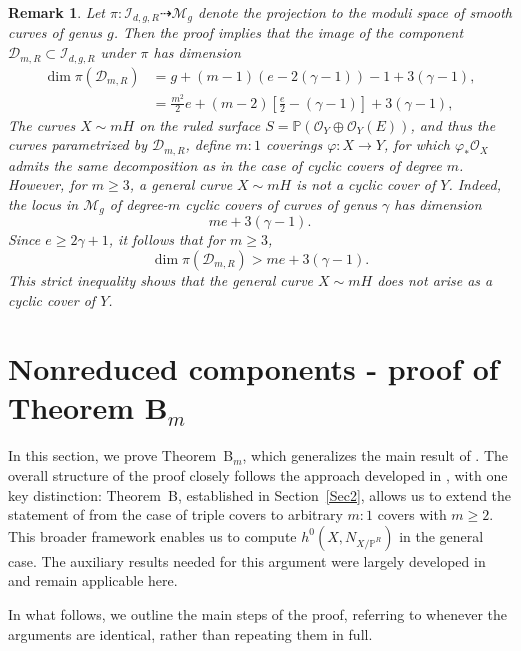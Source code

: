 \documentclass[a4paper,12pt]{amsart}
\newtheorem{remark}[thm]{Remark}
\def\dim{\operatorname{dim}}
\begin{document}
\medskip

\begin{remark}
Let $\pi : \mathcal{I}_{d, g, R} \dashrightarrow \mathcal{M}_g$ denote the projection to the moduli space of smooth curves of genus $g$. Then the proof implies that the image of the component $\mathcal{D}_{m,R} \subset \mathcal{I}_{d, g, R}$ under $\pi$ has dimension
\[
\begin{aligned}
 \dim \pi (\mathcal{D}_{m,R}) & = g + (m-1)(e - 2(\gamma-1)) - 1 + 3(\gamma-1) ,   \\
 & = \frac{m^2}{2}e + (m-2) \left[ \frac{e}{2}-(\gamma-1) \right] + 3(\gamma-1) ,
\end{aligned}
\]
The curves $X \sim mH$ on the ruled surface $S = \mathbb{P} (\mathcal{O}_Y \oplus \mathcal{O}_Y (E))$, and thus the curves parametrized by $\mathcal{D}_{m,R}$, define $m\!:\!1$ coverings $\varphi : X \to Y$, for which $\varphi_{\ast} \mathcal{O}_X$ admits the same decomposition as in the case of cyclic covers of degree $m$. However, for $m \geq 3$, a general curve $X \sim mH$ is not a cyclic cover of $Y$.
Indeed, the locus in $\mathcal{M}_g$ of degree-$m$ cyclic covers of curves of genus $\gamma$ has dimension
\[
me + 3(\gamma - 1).
\]
Since $e \geq 2\gamma + 1$, it follows that for $m \geq 3$,
\[
 \dim \pi(\mathcal{D}_{m,R}) > me + 3(\gamma - 1).
\]
This strict inequality shows that the general curve $X \sim mH$ does not arise as a cyclic cover of $Y$.
\end{remark}

\medskip



\section{Nonreduced components - proof of Theorem B\texorpdfstring{$_m$}{m}}\label{Sec5}
In this section, we prove \textnormal{Theorem~B$_m$}, which generalizes the main result of \cite{CIK24b}. The overall structure of the proof closely follows the approach developed in \cite{CIK24b}, with one key distinction: \textnormal{Theorem~B}, established in Section~\ref{Sec2}, allows us to extend the statement of \cite[Proposition~6]{CIK24b} from the case of triple covers to arbitrary $m:1$ covers with $m \geq 2$. This broader framework enables us to compute $h^0 (X, N_{X/\mathbb{P}^R})$ in the general case. The auxiliary results needed for this argument were largely developed in \cite{CIK24b} and remain applicable here.

In what follows, we outline the main steps of the proof, referring to \cite{CIK24b} whenever the arguments are identical, rather than repeating them in full.
\end{document}
